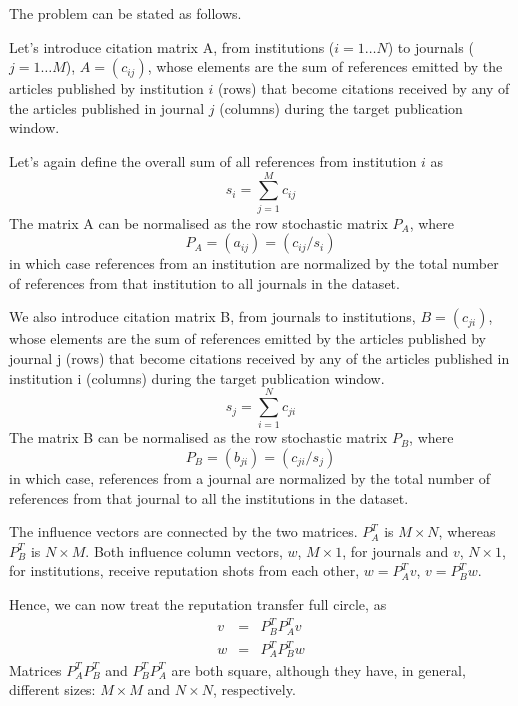 \documentclass[10pt]{article}
\begin{document}
\noindent The problem can be stated as follows.

Let's introduce  citation matrix A, from institutions ($i=1\ldots N$) to journals ($j=1\ldots M$), $A = (c_{ij})$,  whose elements are the sum of references emitted by
the articles published by institution $i$ (rows) that become citations received by any of the articles published in journal $j$ (columns) during the target
publication window.

\noindent Let's again define the overall sum of all references from institution $i$ as
\begin{equation}
s_i = \sum_{j=1}^Mc_{ij}
\end{equation}
The matrix A can be normalised as the row stochastic matrix $P_A$, where
\begin{equation}
P_A = (a_{ij}) = (c_{ij}/s_i)
\label{pa}
\end{equation}
in which case references from an institution are normalized by the total number of references from that institution to all journals in the dataset.


We also  introduce  citation matrix B, from journals  to institutions, $B = (c_{ji})$,  whose elements are the sum of references emitted by
the articles published by journal j (rows) that become citations received by any of the articles published in institution i (columns) during the target
publication window.
\begin{equation}
s_j = \sum_{i=1}^Nc_{ji}
\end{equation}
The matrix B can be normalised as the row stochastic matrix $P_B$, where
\begin{equation}
P_B = (b_{ji}) = (c_{ji}/s_j)
\label{pb}
\end{equation}
in which case, references from a journal are normalized by the total number of references from that journal to all the institutions in the dataset.



The influence vectors are connected by the two matrices. $P_A^T$ is $M\times N$, whereas $P_B^T$ is $N\times M$. Both influence column vectors, $w$, $M\times1$, for journals and $v$, $N\times1$, for institutions, receive reputation shots from each other, $w=P_A^Tv$, $v=P_B^Tw$.

Hence, we can now treat the reputation transfer full circle, as
\begin{eqnarray}
 v & = & P_B^TP_A^Tv\\
 w & = & P_A^TP_B^Tw
 \end{eqnarray}
 Matrices $P_A^TP_B^T$ and $P_B^TP_A^T$ are both square, although they have, in general, different sizes: $M\times M$ and $N\times N$, respectively.
\end{document}
